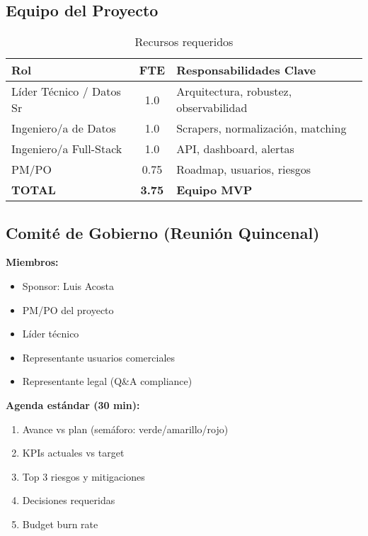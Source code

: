 \documentclass[12pt,a4paper]{article}
\begin{document}
\subsection{Equipo del Proyecto}

\begin{table}[h]
\centering
\begin{tabularx}{\textwidth}{|X|c|X|}
\hline
\rowcolor{lightgray}
\textbf{Rol} & \textbf{FTE} & \textbf{Responsabilidades Clave} \\
\hline
Líder Técnico / Datos Sr & 1.0 & Arquitectura, robustez, observabilidad \\
\hline
Ingeniero/a de Datos & 1.0 & Scrapers, normalización, matching \\
\hline
Ingeniero/a Full-Stack & 1.0 & API, dashboard, alertas \\
\hline
PM/PO & 0.75 & Roadmap, usuarios, riesgos \\
\hline
\rowcolor{lightgray}
\textbf{TOTAL} & \textbf{3.75} & \textbf{Equipo MVP} \\
\hline
\end{tabularx}
\caption{Recursos requeridos}
\end{table}

\subsection{Comité de Gobierno (Reunión Quincenal)}

\textbf{Miembros:}
\begin{itemize}[leftmargin=*]
    \item Sponsor: Luis Acosta
    \item PM/PO del proyecto
    \item Líder técnico
    \item Representante usuarios comerciales
    \item Representante legal (Q\&A compliance)
\end{itemize}

\textbf{Agenda estándar (30 min):}
\begin{enumerate}[leftmargin=*]
    \item Avance vs plan (semáforo: verde/amarillo/rojo)
    \item KPIs actuales vs target
    \item Top 3 riesgos y mitigaciones
    \item Decisiones requeridas
    \item Budget burn rate
\end{enumerate}
\end{document}
